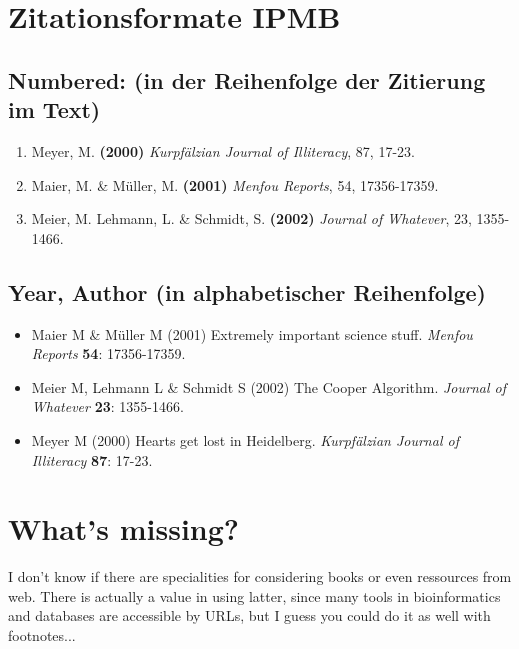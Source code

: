 \documentclass[a4paper]{scrartcl}
\begin{document}
\section*{Zitationsformate IPMB}
\subsection*{Numbered: (in der Reihenfolge der Zitierung im Text)}
\begin{enumerate}
\item Meyer, M. \textbf{(2000)} \textit{Kurpfälzian Journal of Illiteracy}, 87, 17-23.
\item Maier, M. \& Müller, M. \textbf{(2001)} \textit{Menfou Reports}, 54, 17356-17359.
\item Meier, M. Lehmann, L. \& Schmidt, S. \textbf{(2002)} \textit{Journal of Whatever}, 23, 1355-
1466.
\end{enumerate}

\subsection*{Year, Author (in alphabetischer Reihenfolge)}
\begin{itemize}
\item[]  Maier M \& Müller M (2001) Extremely important science stuff. \textit{Menfou Reports}
\textbf{54}: 17356-17359.
\item[] Meier M, Lehmann L \& Schmidt S (2002) The Cooper Algorithm. \textit{Journal of
Whatever} \textbf{23}: 1355-1466.
\item[] Meyer M (2000) Hearts get lost in Heidelberg. \textit{Kurpfälzian Journal of Illiteracy}
\textbf{87}: 17-23.
\end{itemize}

\section*{What's missing?}
I don't know if there are specialities for considering books or even ressources from web. There is actually a value in using latter, since many tools in bioinformatics and databases are accessible by URLs, but I guess you could do it as well with footnotes...
\end{document}
